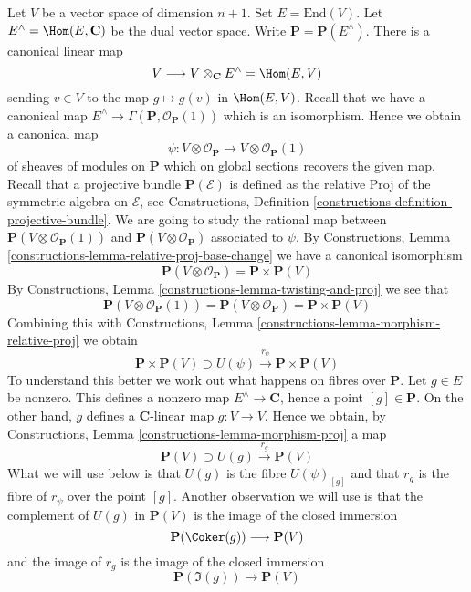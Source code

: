 \noindent
Let $V$ be a vector space of dimension $n + 1$. Set $E = \text{End}(V)$.
Let $E^\wedge = \Hom(E, \mathbf{C})$ be the dual vector space.
Write $\mathbf{P} = \mathbf{P}(E^\wedge)$.
There is a canonical linear map
$$
V \longrightarrow V \otimes_\mathbf{C} E^\wedge = \Hom(E, V)
$$
sending $v \in V$ to the map $g \mapsto g(v)$ in $\Hom(E, V)$.
Recall that we have a canonical map
$E^\wedge \to \Gamma(\mathbf{P}, \mathcal{O}_\mathbf{P}(1))$
which is an isomorphism. Hence we obtain a canonical map
$$
\psi : V \otimes \mathcal{O}_\mathbf{P} \to V \otimes \mathcal{O}_\mathbf{P}(1)
$$
of sheaves of modules on $\mathbf{P}$ which on global sections recovers
the given map. Recall that a projective bundle $\mathbf{P}(\mathcal{E})$
is defined as the relative Proj of the symmetric algebra on $\mathcal{E}$, see
Constructions, Definition \ref{constructions-definition-projective-bundle}.
We are going to study the rational
map between $\mathbf{P}(V \otimes \mathcal{O}_\mathbf{P}(1))$ and
$\mathbf{P}(V \otimes \mathcal{O}_\mathbf{P})$ associated to $\psi$. By
Constructions, Lemma \ref{constructions-lemma-relative-proj-base-change}
we have a canonical isomorphism
$$
\mathbf{P}(V \otimes \mathcal{O}_\mathbf{P}) = \mathbf{P} \times \mathbf{P}(V)
$$
By Constructions, Lemma \ref{constructions-lemma-twisting-and-proj}
we see that
$$
\mathbf{P}(V \otimes \mathcal{O}_\mathbf{P}(1)) =
\mathbf{P}(V \otimes \mathcal{O}_\mathbf{P}) = \mathbf{P} \times \mathbf{P}(V)
$$
Combining this with
Constructions, Lemma \ref{constructions-lemma-morphism-relative-proj}
we obtain
\begin{equation}
\label{equation-r-psi}
\mathbf{P} \times \mathbf{P}(V) \supset
U(\psi) \xrightarrow{r_\psi} \mathbf{P} \times \mathbf{P}(V)
\end{equation}
To understand this better we work out what happens on fibres over
$\mathbf{P}$. Let $g \in E$ be nonzero. This defines a nonzero map
$E^\wedge \to \mathbf{C}$, hence a point $[g] \in \mathbf{P}$.
On the other hand, $g$ defines a $\mathbf{C}$-linear map $g : V \to V$.
Hence we obtain, by
Constructions, Lemma \ref{constructions-lemma-morphism-proj}
a map
$$
\mathbf{P}(V) \supset U(g) \xrightarrow{r_g} \mathbf{P}(V)
$$
What we will use below is that $U(g)$ is the fibre $U(\psi)_{[g]}$ and
that $r_g$ is the fibre of $r_\psi$ over the point $[g]$. Another observation
we will use is that the complement of $U(g)$ in $\mathbf{P}(V)$ is
the image of the closed immersion
$$
\mathbf{P}(\Coker(g)) \longrightarrow \mathbf{P}(V)
$$
and the image of $r_g$ is the image of the closed immersion
$$
\mathbf{P}(\Im(g)) \longrightarrow \mathbf{P}(V)
$$

